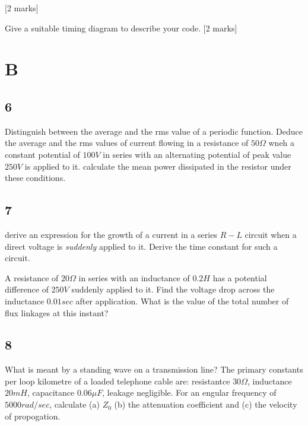 \documentclass[a4paper,12pt]{article}
\begin{document}
[2 marks]

Give a suitable timing diagram to describe your code. [2 marks]

\section*{B}

\subsection*{6}

Distinguish between the average and the rms value of a periodic
function. Deduce the average and the rms values of current flowing in a
resistance of $50 \Omega$ wneh a constant potential of $100V$ in series
with an alternating potential of peak value $250V$ is applied to it.
calculate the mean power dissipated in the resistor under these
conditions.

\subsection*{7}

derive an expression for the growth of a current in a series $R-L$
circuit when a direct voltage is \emph{suddenly} applied to it. Derive
the time constant for such a circuit.

A resistance of $20 \Omega$ in series with an inductance of $0.2 H$ has
a potential difference of $250V$ suddenly applied to it. Find the
voltage drop across the inductance $0.01 sec$ after application. What is
the value of the total number of flux linkages at this instant?

\subsection*{8}

What is meant by a standing wave on a transmission line? The primary
constants per loop kilometre of a loaded telephone cable are:
resistantce $30 \Omega$, inductance $20 mH$, capacitance $0.06 \mu F$,
leakage negligible. For an engular frequency of $5000 rad/sec$,
calculate (a) $Z_{0}$ (b) the attenuation coefficient and (c) the
velocity of propogation.
\end{document}
